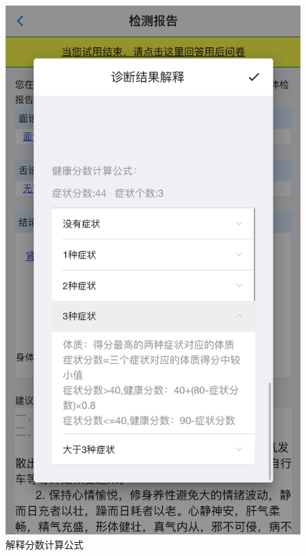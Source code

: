 \begin{figure}
    \centering
    \includegraphics{images/report9.png}
    \caption{解释分数计算公式}
    \label{fig:report_expalin_score_3}
\end{figure}

